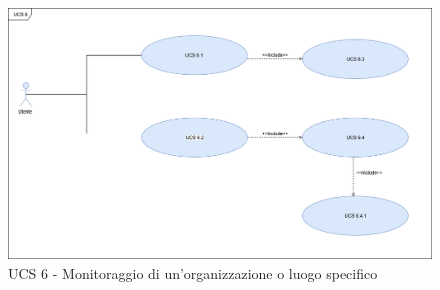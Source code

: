 \begin{figure}[h]
\centering
\includegraphics[scale=0.3]{sezioni/UseCase/Immagini/UCS6.png}%
\caption{UCS 6 - Monitoraggio di un'organizzazione o luogo specifico}
\label{logo}
\end{figure}

